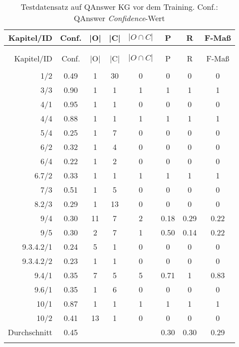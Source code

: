 \begin{longtable}{r c c c c c c c}
  \caption[Testdatensatz QAnswer vor Training]{Testdatensatz auf QAnswer KG vor dem Training.
  Conf.: QAnswer \emph{Confidence}-Wert}
  \label{tab:qanswervortraining}
  \\
  \toprule
  Kapitel/ID    & Conf. & |O|   & |C|   & $|O \cap C|$  & P     & R     & F-Maß   \\
  \midrule \\
  \endfirsthead
  \\
  \toprule
  Kapitel/ID    & Conf. & |O|   & |C|   & $|O \cap C|$  & P     & R     & F-Maß   \\
  \midrule \\
  \endhead
  1/2           & 0.49  & 1     & 30    & 0             & 0     & 0     & 0       \\
  3/3           & 0.90  & 1     & 1     & 1             & 1     & 1     & 1       \\
  4/1           & 0.95  & 1     & 1     & 0             & 0     & 0     & 0       \\
  4/4           & 0.88  & 1     & 1     & 1             & 1     & 1     & 1       \\
  5/4           & 0.25  & 1     & 7     & 0             & 0     & 0     & 0       \\
  6/2           & 0.32  & 1     & 4     & 0             & 0     & 0     & 0       \\
  6/4           & 0.22  & 1     & 2     & 0             & 0     & 0     & 0       \\
  6.7/2         & 0.33  & 1     & 1     & 1             & 1     & 1     & 1       \\
  7/3           & 0.51  & 1     & 5     & 0             & 0     & 0     & 0       \\
  8.2/3         & 0.29  & 1     & 13    & 0             & 0     & 0     & 0       \\
  9/4           & 0.30  & 11    & 7     & 2             & 0.18  & 0.29  & 0.22    \\
  9/5           & 0.30  & 2     & 7     & 1             & 0.50  & 0.14  & 0.22    \\
  9.3.4.2/1     & 0.24  & 5     & 1     & 0             & 0     & 0     & 0       \\
  9.3.4.2/2     & 0.23  & 1     & 1     & 0             & 0     & 0     & 0       \\
  9.4/1         & 0.35  & 7     & 5     & 5             & 0.71  & 1     & 0.83    \\
  9.6/1         & 0.35  & 1     & 6     & 0             & 0     & 0     & 0       \\
  10/1          & 0.87  & 1     & 1     & 1             & 1     & 1     & 1       \\
  10/2          & 0.41  & 13    & 1     & 0             & 0     & 0     & 0       \\
  \midrule
  Durchschnitt  & 0.45  &       &       &               & 0.30  & 0.30  & 0.29    \\
  \bottomrule \\
\end{longtable}

